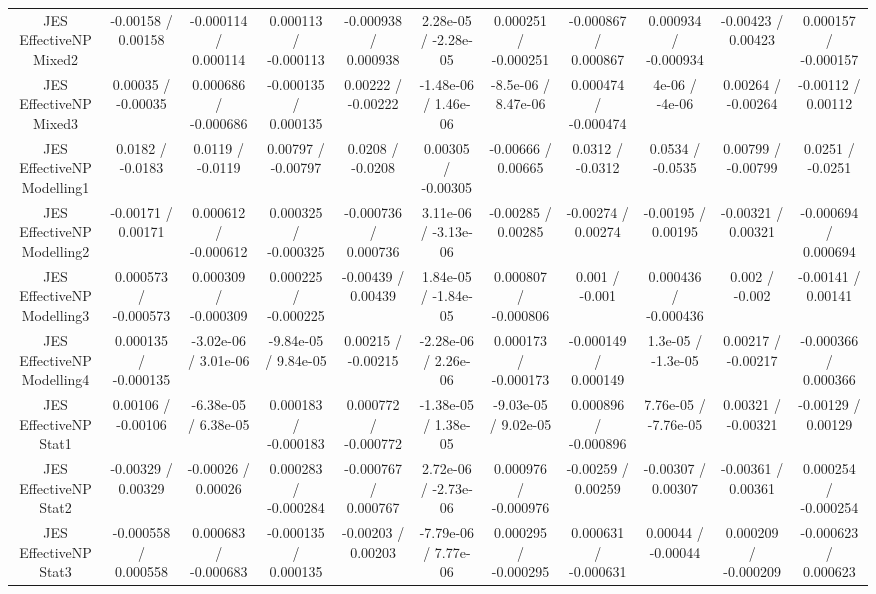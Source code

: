 \begin{table}[htbp]
\begin{center}
\begin{tabular}{|c|c|c|c|c|c|c|c|c|c|c|}
  JES EffectiveNP Mixed2 & -0.00158 / 0.00158 & -0.000114 / 0.000114 & 0.000113 / -0.000113 & -0.000938 / 0.000938 & 2.28e-05 / -2.28e-05 & 0.000251 / -0.000251 & -0.000867 / 0.000867 & 0.000934 / -0.000934 & -0.00423 / 0.00423 & 0.000157 / -0.000157 \\ 
  JES EffectiveNP Mixed3 & 0.00035 / -0.00035 & 0.000686 / -0.000686 & -0.000135 / 0.000135 & 0.00222 / -0.00222 & -1.48e-06 / 1.46e-06 & -8.5e-06 / 8.47e-06 & 0.000474 / -0.000474 & 4e-06 / -4e-06 & 0.00264 / -0.00264 & -0.00112 / 0.00112 \\ 
  JES EffectiveNP Modelling1 & 0.0182 / -0.0183 & 0.0119 / -0.0119 & 0.00797 / -0.00797 & 0.0208 / -0.0208 & 0.00305 / -0.00305 & -0.00666 / 0.00665 & 0.0312 / -0.0312 & 0.0534 / -0.0535 & 0.00799 / -0.00799 & 0.0251 / -0.0251 \\ 
  JES EffectiveNP Modelling2 & -0.00171 / 0.00171 & 0.000612 / -0.000612 & 0.000325 / -0.000325 & -0.000736 / 0.000736 & 3.11e-06 / -3.13e-06 & -0.00285 / 0.00285 & -0.00274 / 0.00274 & -0.00195 / 0.00195 & -0.00321 / 0.00321 & -0.000694 / 0.000694 \\ 
  JES EffectiveNP Modelling3 & 0.000573 / -0.000573 & 0.000309 / -0.000309 & 0.000225 / -0.000225 & -0.00439 / 0.00439 & 1.84e-05 / -1.84e-05 & 0.000807 / -0.000806 & 0.001 / -0.001 & 0.000436 / -0.000436 & 0.002 / -0.002 & -0.00141 / 0.00141 \\ 
  JES EffectiveNP Modelling4 & 0.000135 / -0.000135 & -3.02e-06 / 3.01e-06 & -9.84e-05 / 9.84e-05 & 0.00215 / -0.00215 & -2.28e-06 / 2.26e-06 & 0.000173 / -0.000173 & -0.000149 / 0.000149 & 1.3e-05 / -1.3e-05 & 0.00217 / -0.00217 & -0.000366 / 0.000366 \\ 
  JES EffectiveNP Stat1 & 0.00106 / -0.00106 & -6.38e-05 / 6.38e-05 & 0.000183 / -0.000183 & 0.000772 / -0.000772 & -1.38e-05 / 1.38e-05 & -9.03e-05 / 9.02e-05 & 0.000896 / -0.000896 & 7.76e-05 / -7.76e-05 & 0.00321 / -0.00321 & -0.00129 / 0.00129 \\ 
  JES EffectiveNP Stat2 & -0.00329 / 0.00329 & -0.00026 / 0.00026 & 0.000283 / -0.000284 & -0.000767 / 0.000767 & 2.72e-06 / -2.73e-06 & 0.000976 / -0.000976 & -0.00259 / 0.00259 & -0.00307 / 0.00307 & -0.00361 / 0.00361 & 0.000254 / -0.000254 \\ 
  JES EffectiveNP Stat3 & -0.000558 / 0.000558 & 0.000683 / -0.000683 & -0.000135 / 0.000135 & -0.00203 / 0.00203 & -7.79e-06 / 7.77e-06 & 0.000295 / -0.000295 & 0.000631 / -0.000631 & 0.00044 / -0.00044 & 0.000209 / -0.000209 & -0.000623 / 0.000623 \\ 

\end{tabular}
\end{center}
\end{table}
